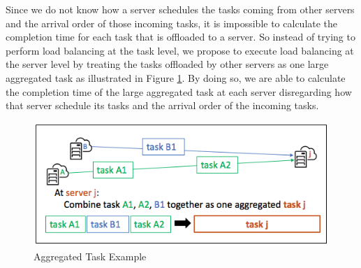  Since we do not know how a server schedules the tasks coming from other servers and the arrival order of those incoming tasks, it is impossible to calculate the completion time for each task that is offloaded to a server. So instead of trying to perform load balancing at the task level, we propose to execute load balancing at the server level by treating the tasks offloaded by other servers as one large aggregated task as illustrated in Figure \ref{opt_agg}. By doing so, we are able to calculate the completion time of the large aggregated task at each server disregarding how that server schedule its tasks and the arrival order of the incoming tasks. 
 


\begin{figure}[ht!]
\centering
\includegraphics[width=1\linewidth]{images/opt_agg}
\caption{Aggregated Task Example}
\label{opt_agg}
\end{figure}

